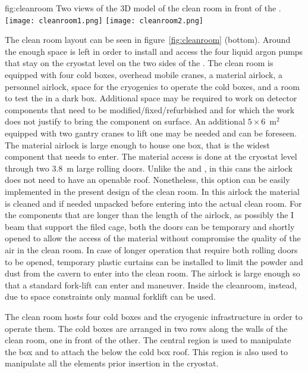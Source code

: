 \begin{dunefigure}{fig:cleanroom}
{Two views of the 3D model of the clean room in front of the .}
\texttt{[image: cleanroom1.png]}
\texttt{[image: cleanroom2.png]}
\end{dunefigure}

The clean room layout can be seen in figure~\ref{fig:cleanroom} (bottom).
Around the  enough space is left in order to install and access the four liquid argon pumps that stay on the cryostat level on the two sides of the .
The clean room is equipped with four cold boxes, overhead mobile cranes, a material airlock, a personnel airlock, space for the cryogenics to operate the cold boxes, and a room to test the  in a dark box.
Additional space may be required to work on detector components that need to be modified/fixed/refurbished and for which the work does not justify to bring the component on surface.
An additional $5\times6$~m$^2$ equipped with two gantry cranes to lift one  may be needed and can be foreseen.
The material airlock is large enough to house one  box, that is the widest component that needs to enter.
The material access is done at the cryostat level through two 3.8~m large rolling doors.
Unlike the  and , in this cans the airlock does not need to have an openable roof.
Nonetheless, this option can be easily implemented in the present design of the clean room.
In this airlock the material is cleaned and if needed unpacked before entering into the actual clean room.
For the components that are longer than the length of the airlock, as possibly the I beam that support the filed cage, both the doors can be temporary and shortly opened to allow the access of the material without compromise the quality of the air in the clean room.
In case of longer operation that require both rolling doors to be opened, temporary plastic curtains can be installed to limit the powder and dust from the cavern to enter into the clean room.
The airlock is large enough so that a standard fork-lift can enter and maneuver.
Inside the cleanroom, instead, due to space constraints only manual forklift can be used.

The clean room hosts four cold boxes and the cryogenic infrastructure in order to operate them.
The cold boxes are arranged in two rows along the walls of the clean room, one in front of the other.
The central region is used to manipulate the  box and to attach the  below the cold box roof.
This region is also used to manipulate all the elements prior insertion in the cryostat.

